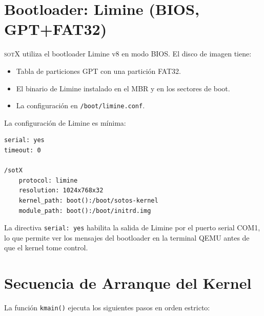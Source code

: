 \documentclass[11pt,twoside,openright]{book}
\theoremstyle{definition}
\theoremstyle{plain}
\theoremstyle{remark}
\newcommand{\sotos}{\textsc{sotX}}
\begin{document}
\section{Bootloader: Limine (BIOS, GPT+FAT32)}
\label{sec:limine}

\sotos{} utiliza el bootloader Limine v8 en modo BIOS. El disco de imagen tiene:
\begin{itemize}
    \item Tabla de particiones GPT con una partición FAT32.
    \item El binario de Limine instalado en el MBR y en los sectores de boot.
    \item La configuración en \texttt{/boot/limine.conf}.
\end{itemize}

La configuración de Limine es mínima:

\begin{lstlisting}[language={},basicstyle=\ttfamily\small,frame=single,caption={Contenido de \texttt{boot/limine.conf}.},label={lst:limine-conf}]
serial: yes
timeout: 0

/sotX
    protocol: limine
    resolution: 1024x768x32
    kernel_path: boot():/boot/sotos-kernel
    module_path: boot():/boot/initrd.img
\end{lstlisting}

La directiva \texttt{serial: yes} habilita la salida de Limine por el puerto
serial COM1, lo que permite ver los mensajes del bootloader en la terminal QEMU
antes de que el kernel tome control.

\section{Secuencia de Arranque del Kernel}
\label{sec:boot-sequence}

La función \texttt{kmain()} ejecuta los siguientes pasos en orden estricto:
\end{document}
